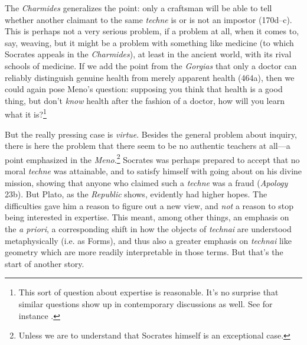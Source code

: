 ﻿\documentclass[11pt]{amsart}
\begin{document}

The \emph{Charmides} generalizes the point: only a craftsman will be able to tell whether another claimant to the same \emph{techne} is or is not an impostor (170d--c). This is perhaps not a very serious problem, if a problem at all, when it comes to, say, weaving, but it might be a problem with something like medicine (to which Socrates appeals in the \emph{Charmides}), at least in the ancient world, with its rival schools of medicine. If we add the point from the \emph{Gorgias} that only a doctor can reliably distinguish genuine health from merely apparent health (464a), then we could again pose Meno's question: supposing you think that health is a good thing, but don't \emph{know} health after the fashion of a doctor, how will you learn what it is?\footnote{This sort of question about expertise is reasonable. It's no surprise that similar questions show up in contemporary discussions as well. See for instance \citet{goldman2001experts}.} 

But the really pressing case is \emph{virtue}. Besides the general problem about inquiry, there is here the problem that there seem to be no authentic teachers at all---a point emphasized in the \emph{Meno}.\footnote{Unless we are to understand that Socrates himself is an exceptional case.} Socrates was perhaps prepared to accept that no moral \emph{techne} was attainable, and to satisfy himself with going about on his divine mission, showing that anyone who claimed such a \emph{techne} was a fraud (\emph{Apology} 23b). But Plato, as the \emph{Republic} shows, evidently had higher hopes. The difficulties gave him a reason to figure out a new view, and \emph{not} a reason to stop being interested in expertise. This meant, among other things, an emphasis on the \emph{a priori}, a corresponding shift in how the objects of \emph{technai} are understood metaphysically (i.e. as Forms), and thus also a greater emphasis on \emph{technai} like geometry which are more readily interpretable in those terms. But that's the start of another story.


\end{document}
